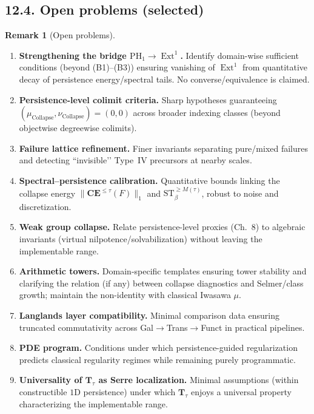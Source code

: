 \documentclass[11pt]{article}
\DeclareMathOperator{\Ext}{Ext}
\DeclareRobustCommand{\hyp}{\nobreakdash-}
\numberwithin{equation}{section}
\theoremstyle{definition}
\newtheorem{remark}[theorem]{Remark}
\DeclareRobustCommand{\muc}{\mu_{\mathrm{Collapse}}}
\DeclareRobustCommand{\nuc}{\nu_{\mathrm{Collapse}}}
\begin{document}
\subsection*{12.4. Open problems (selected)}
\begin{remark}[Open problems]\label{rk:12-open}
\hfill
\begin{enumerate}
  \item \textbf{Strengthening the bridge \( \mathrm{PH}_1\to \Ext^1 \).} Identify domain\hyp wise sufficient conditions (beyond (B1)–(B3)) ensuring vanishing of \(\Ext^1\) from quantitative decay of persistence energy/spectral tails. No converse/equivalence is claimed.
  \item \textbf{Persistence\hyp level colimit criteria.} Sharp hypotheses guaranteeing \((\muc,\nuc)=(0,0)\) across broader indexing classes (beyond objectwise degreewise colimits).
  \item \textbf{Failure lattice refinement.} Finer invariants separating pure/mixed failures and detecting “invisible’’ Type~IV precursors at nearby scales.
  \item \textbf{Spectral–persistence calibration.} Quantitative bounds linking the collapse energy \(\|\mathbf{CE}^{\le \tau}(F)\|_{1}\) and \(\mathrm{ST}_{\beta}^{\ge M(\tau)}\), robust to noise and discretization.
  \item \textbf{Weak group collapse.} Relate persistence\hyp level proxies (Ch.~8) to algebraic invariants (virtual nilpotence/solvabilization) without leaving the implementable range.
  \item \textbf{Arithmetic towers.} Domain\hyp specific templates ensuring tower stability and clarifying the relation (if any) between collapse diagnostics and Selmer/class growth; maintain the non\hyp identity with classical Iwasawa \(\mu\).
  \item \textbf{Langlands layer compatibility.} Minimal comparison data ensuring truncated commutativity across Gal\(\to\)Trans\(\to\)Funct in practical pipelines.
  \item \textbf{PDE program.} Conditions under which persistence\hyp guided regularization predicts classical regularity regimes while remaining purely programmatic.
  \item \textbf{Universality of \(\mathbf{T}_\tau\) as Serre localization.} Minimal assumptions (within constructible \(1\)D persistence) under which \(\mathbf{T}_\tau\) enjoys a universal property characterizing the implementable range.
\end{enumerate}
\end{remark}
\end{document}
